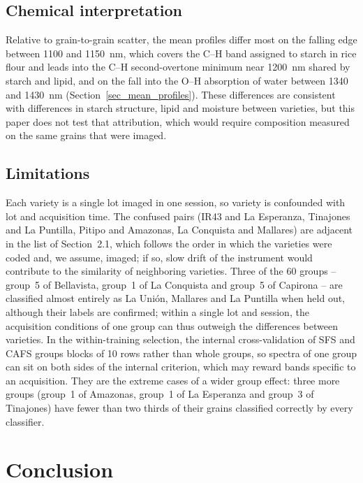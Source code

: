\documentclass[final,5p,times,twocolumn]{elsarticle}
\begin{document}
{\subsection{Chemical interpretation}
Relative to grain-to-grain scatter, the mean profiles differ most on the falling edge between 1100 and 1150~nm, which covers the C--H band assigned to starch in rice flour \citep{Shao2011starch} and leads into the C--H second-overtone minimum near 1200~nm shared by starch and lipid, and on the fall into the O--H absorption of water between 1340 and 1430~nm (Section~\ref{sec_mean_profiles}). These differences are consistent with differences in starch structure, lipid and moisture between varieties, but this paper does not test that attribution, which would require composition measured on the same grains that were imaged.

\subsection{Limitations}\label{sec_limitations}
Each variety is a single lot imaged in one session, so variety is confounded with lot and acquisition time. The confused pairs (IR43 and La Esperanza, Tinajones and La Puntilla, Pitipo and Amazonas, La Conquista and Mallares) are adjacent in the list of Section~2.1, which follows the order in which the varieties were coded and, we assume, imaged; if so, slow drift of the instrument would contribute to the similarity of neighboring varieties. Three of the 60 groups -- group~5 of Bellavista, group~1 of La Conquista and group~5 of Capirona -- are classified almost entirely as La Uni\'on, Mallares and La Puntilla when held out, although their labels are confirmed; within a single lot and session, the acquisition conditions of one group can thus outweigh the differences between varieties. In the within-training selection, the internal cross-validation of SFS and CAFS groups blocks of 10 rows rather than whole groups, so spectra of one group can sit on both sides of the internal criterion, which may reward bands specific to an acquisition. They are the extreme cases of a wider group effect: three more groups (group~1 of Amazonas, group~1 of La Esperanza and group~3 of Tinajones) have fewer than two thirds of their grains classified correctly by every classifier.}

\section{Conclusion}
\end{document}
